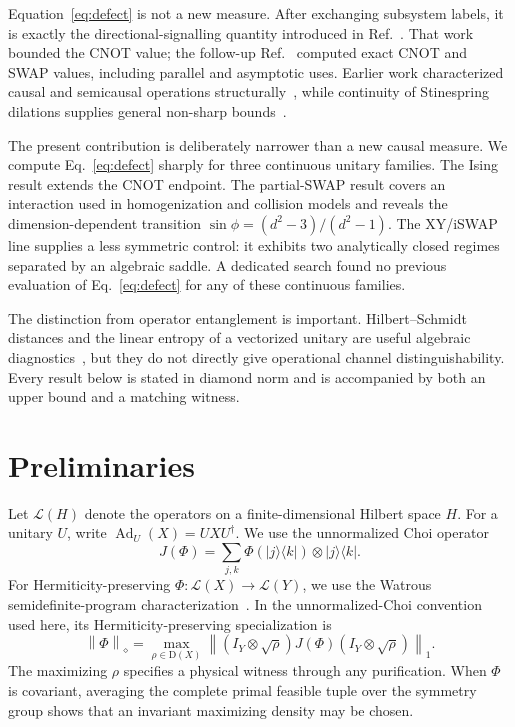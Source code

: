 \documentclass[11pt,a4paper]{article}
\theoremstyle{remark}
\newcommand{\Ad}{\operatorname{Ad}}
\newcommand{\cL}{\mathcal{L}}
\newcommand{\diamondnorm}[1]{\left\lVert #1\right\rVert_{\diamond}}
\newcommand{\tracenorm}[1]{\left\lVert #1\right\rVert_{1}}
\begin{document}
Equation~\eqref{eq:defect} is not a new measure.  After exchanging subsystem
labels, it is exactly the directional-signalling quantity introduced in
Ref.~\cite{barsse2024}.  That work bounded the CNOT value; the follow-up
Ref.~\cite{barsse2025} computed exact CNOT and SWAP values, including parallel
and asymptotic uses.  Earlier work characterized causal and semicausal
operations structurally~\cite{beckman2001,eggeling2002}, while continuity of
Stinespring dilations supplies general non-sharp bounds~\cite{ksw2008}.

The present contribution is deliberately narrower than a new causal measure.
We compute Eq.~\eqref{eq:defect} sharply for three continuous unitary families.
The Ising result extends the CNOT endpoint.  The partial-SWAP result covers an
interaction used in homogenization and collision models
\cite{ziman2002,scarani2002} and reveals the dimension-dependent transition
$\sin\phi=(d^2-3)/(d^2-1)$.  The XY/iSWAP line supplies a less symmetric
control: it exhibits two analytically closed regimes separated by an algebraic
saddle.  A dedicated search found no previous evaluation of
Eq.~\eqref{eq:defect} for any of these continuous families.

The distinction from operator entanglement is important.  Hilbert--Schmidt
distances and the linear entropy of a vectorized unitary are useful algebraic
diagnostics~\cite{zanardi2001}, but they do not directly give operational
channel distinguishability.  Every result below is stated in diamond norm and
is accompanied by both an upper bound and a matching witness.

\section{Preliminaries}

Let $\cL(H)$ denote the operators on a finite-dimensional Hilbert space $H$.
For a unitary $U$, write $\Ad_U(X)=UXU^\dagger$.  We use the unnormalized Choi
operator
\[
 J(\Phi)=\sum_{j,k}\Phi(|j\rangle\langle k|)
                 \otimes |j\rangle\langle k|.
\]
For Hermiticity-preserving $\Phi:\cL(X)\to\cL(Y)$, we use the Watrous
semidefinite-program characterization~\cite{watrous2009,watrous2018}.
In the unnormalized-Choi convention used here, its Hermiticity-preserving
specialization is
\begin{equation}
 \diamondnorm{\Phi}
 =\max_{\rho\in\mathrm{D}(X)}
 \tracenorm{(I_Y\otimes\sqrt{\rho})J(\Phi)
                     (I_Y\otimes\sqrt{\rho})}.
 \label{eq:watrous}
\end{equation}
The maximizing $\rho$ specifies a physical witness through any purification.
When $\Phi$ is covariant, averaging the complete primal feasible tuple over the
symmetry group shows that an invariant maximizing density may be chosen.
\end{document}
